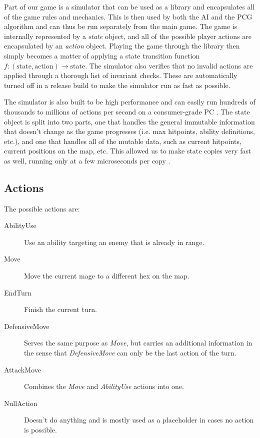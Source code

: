 Part of our game is a simulator that can be used as a library and encapsulates all of the
game rules and mechanics. This is then used by both the AI and the PCG algorithm and can thus
be run separately from the main game. The game is internally represented by a \emph{state} object,
and all of the possible player actions are encapsulated by an \emph{action} object.
Playing the game through the library then simply becomes a matter of applying a state transition
function $f: (\text{state}, \text{action}) \rightarrow \text{state}$. The simulator also verifies
that no invalid actions are applied through a thorough list of invariant checks. These are automatically
turned off in a release build to make the simulator run as fast as possible.

The simulator is also built to be high performance and can easily run hundreds of thousands to millions
of actions per second on a consumer-grade PC . The state object is split into two parts,
one that handles the general immutable information that doesn't change as the game progresses (i.e. max hitpoints, ability definitions, etc.),
and one that handles all of the mutable data, such as current hitpoints, current positions on the map, etc.
This allowed us to make state copies very fast as well, running only at a few microseconds per copy .

\subsection{Actions}
The possible actions are:

\begin{description}
\item [AbilityUse] Use an ability targeting an enemy that is already in range.
\item [Move] Move the current mage to a different hex on the map.
\item [EndTurn] Finish the current turn.
\item [DefensiveMove] Serves the same purpose as \emph{Move}, but carries an
additional information in the sense that \emph{DefensiveMove} can only be
the last action of the turn.
\item [AttackMove] Combines the \emph{Move} and \emph{AbilityUse} actions into one.
\item [NullAction] Doesn't do anything and is mostly used as a placeholder in cases no action is possible.
\end{description}
